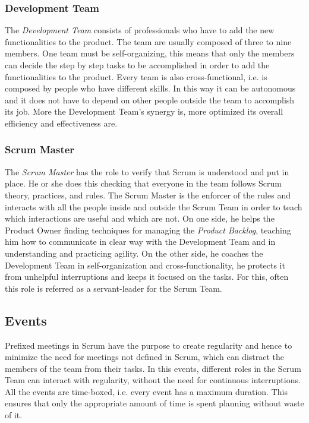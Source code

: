 			\subsubsection{Development Team}
			The \emph{Development Team} consists of professionals who have to add the new functionalities to the product. The team are usually composed of three to nine members. One team must be self-organizing, this means that only the members can decide the step by step tasks to be accomplished in order to add the functionalities to the product. Every team is also cross-functional, i.e. is composed by people who have different skills. In this way it can be autonomous and it does not have to depend on other people outside the team to accomplish its job. More the Development Team's synergy is, more optimized its overall efficiency and effectiveness are.
 
			\subsubsection{Scrum Master}
			The \emph{Scrum Master} has the role to verify that Scrum is understood and put in place. He or she does this checking that everyone in the team follows Scrum theory, practices, and rules. 
			The Scrum Master is the enforcer of the rules and interacts with all the people inside and outside the Scrum Team in order to teach which interactions are useful and which are not.
			On one side, he helps the Product Owner finding techniques for managing the \emph{Product Backlog}, teaching him how to communicate in clear way with the Development Team and in understanding and practicing agility. On the other side, he coaches the Development Team in self-organization and cross-functionality, he protects it from unhelpful interruptions and keeps it focused on the tasks. 
			For this, often this role is referred as a servant-leader for the Scrum Team.


		\subsection{Events}
			Prefixed meetings in Scrum have the purpose to create regularity and hence to minimize the need for meetings not defined in Scrum, which can distract the members of the team from their tasks. In this events, different roles in the Scrum Team can interact with regularity, without the need for continuous interruptions. All the events are time-boxed, i.e. every event has a maximum duration. This ensures that only the appropriate amount of time is spent planning without waste of it.   
			
